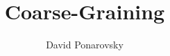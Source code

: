 \documentclass[manuscript,screen,review]{acmart}
\begin{document}

\title{ Coarse-Graining}
\author{David Ponarovsky}
\maketitle

\newcommand*{\xb}{\mathbf{x}}

\ifdefined\SWEEPHEA
\else 
  \newcommand*{\SWEEPHEA}{}
\newcommand{\History}[1]{H_{#1}}
  \newcommand{\Time}[1]{T(#1)}
  \newcommand{\Excuse}[1]{\mathbf{Excuse}(#1)}
  \newcommand{\Excusei}[1]{\mathbf{Excuse}_{i}(#1)}
  \newcommand{\Size}[1]{\mathbf{Size}(#1)}
  \newcommand{\Span}[1]{\mathbf{Span}(#1)}
  \newcommand{\pre}[1]{\text{pre}(#1)}
  \newcommand{\poli}[1]{\text{pole}_{i}(#1)}
  \newcommand{\prei}[1]{\text{pre}_{i}(#1)}
  \newcommand{\predd}[1]{\text{pre}_{d+1}(#1)}
  \newcommand{\rotf}[2]{\theta_{#1 ,#2}}
  \newcommand*{\rotfs}{\rotf{v}{S^{\prime}}}
  \newcommand{\rotfv}[2]{\mathbf{\rotf{#1}{#2} }}
  \newcommand*{\rotfvs}{\mathbf{\rotfs{} }}
\fi

%
%
%
%
\end{document}
